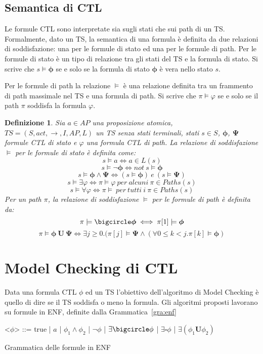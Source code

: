 \documentclass[a4paper, 10pt]{article}
\newtheorem{defn}{Definizione}
\numberwithin{equation}{theor}
\begin{document}
\subsection{Semantica di \ac{CTL}}

Le formule \ac{CTL} sono interpretate sia sugli stati che sui path di un \ac{TS}. Formalmente, dato un \ac{TS}, la semantica di una formula è definita da due relazioni di soddisfazione: una per le formule di stato ed una per le formule di path.
Per le formule di stato è un tipo di relazione tra gli stati del \ac{TS} e la formula di stato. Si scrive che $s \models \boldsymbol{\phi}$ se e solo se la formula di stato $\boldsymbol{\phi}$ è vera nello stato $s$.\par
Per le formule di path la relazione $\models$ è una relazione definita tra un frammento di path massimale nel \ac{TS} e una formula di path. Si scrive che $\pi \models \varphi$ se e solo se il path $\pi$ soddisfa la formula $\varphi$.
\begin{defn}
Sia $a \in AP$ una proposizione atomica, $TS = (S, act, \rightarrow, I, AP, L)$ un \acf{TS} senza stati terminali, stati $s \in S$, $\boldsymbol{\phi}$, $\boldsymbol{\Psi}$ formule \ac{CTL} di stato e $\varphi$ una formula \ac{CTL} di path. La relazione di soddisfazione $\models$ per le formule di stato è definita come:
$$s \models a \iff a \in L(s)$$
$$s \models \neg \boldsymbol{\phi} \iff not\ s \models \boldsymbol{\phi}$$
$$s \models \boldsymbol{\phi} \wedge \boldsymbol{\Psi} \iff (s \models \boldsymbol{\phi})\ e\ (s \models \boldsymbol{\Psi}) $$
$$s \models \exists \varphi \iff \pi \models \varphi\ per\ alcuni\ \pi \in Paths(s)$$
$$s \models \forall \varphi \iff \pi \models\ per\ tutti\ i\ \pi \in Paths(s)$$
Per un path $\pi$, la relazione di soddisfazione $\models$ per le formule di path è definita da:
$$\pi \models \bigcircle \boldsymbol{\phi} \iff \pi[1] \models \boldsymbol{\phi}$$
$$\pi \models \boldsymbol{\phi}\ \boldsymbol{U}\  \boldsymbol{\Psi} \iff \exists j \geqslant 0.(\pi[j] \models \boldsymbol{\Psi} \wedge (\forall 0 \leqslant k < j. \pi[k] \models \boldsymbol{\phi})$$
\end{defn}
\section{Model Checking di \ac{CTL}}
Data una formula \ac{CTL} $\phi$ ed un \ac{TS} l'obiettivo dell'algoritmo di Model Checking è quello di dire se il \ac{TS} soddisfa o meno la formula. Gli algoritmi proposti lavorano su formule in \ac{ENF}, definite dalla Grammatica~\ref{gra:enf}
\begin{Grammar}
	\begin{grammar}	
	
	\centering
	<$\phi$> ::= true | $a$ | $\phi_{1} \wedge \phi_{2}$ | $\neg \phi$ | $\exists\bigcircle\phi$ | $\exists\square\phi$ | $\exists(\phi_{1} \boldsymbol{U} \phi_{2})$
	
	\end{grammar}
	\caption{Grammatica delle formule in ENF}\label{gra:enf}
\end{Grammar}
\end{document}
